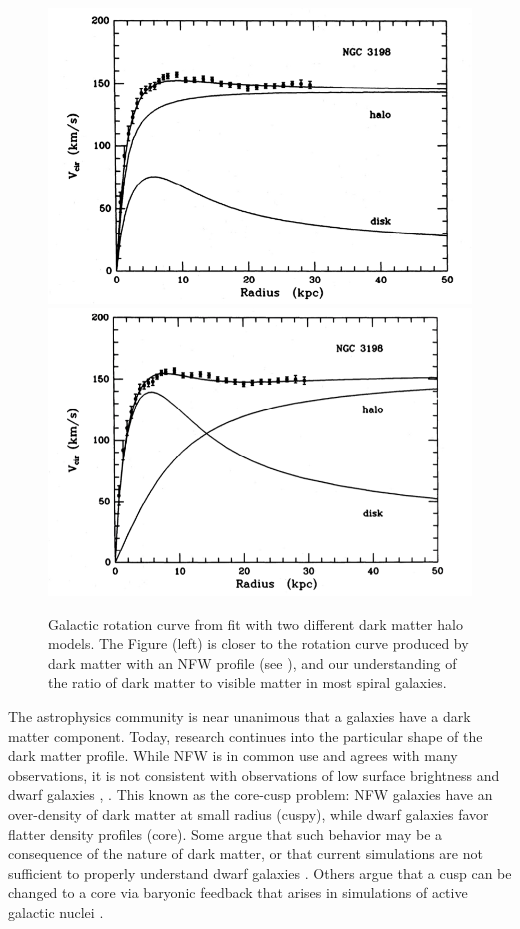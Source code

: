\begin{figure}[htbp]
\begin{center}
\includegraphics[width=\halffig]{figures/theory/rot_curve2.png}
\includegraphics[width=\halffig]{figures/theory/rot_curve1.png}
\caption{Galactic rotation curve from \cite{Albada1985} fit with two different dark matter halo models. The Figure (left) is closer to the rotation curve produced by dark matter with an \acs{NFW} profile (see \cite{Navarro1996}), and our understanding of the ratio of dark matter to visible matter in most spiral galaxies. }
\label{fig:rot_curve}
\end{center}
\end{figure}

The astrophysics community is near unanimous that a galaxies have a dark matter component. Today, research continues into the particular shape of the dark matter profile. While \ac{NFW} is in common use and agrees with many observations, it is not consistent with observations of low surface brightness and dwarf galaxies \cite{DeBlok2001}, \cite{DeBlok2001a}. This known as the core-cusp problem: \ac{NFW} galaxies have an over-density of dark matter at small radius (cuspy), while dwarf galaxies favor flatter density profiles (core). Some argue that such behavior may be a consequence of the nature of dark matter, or that current simulations are not sufficient to properly understand dwarf galaxies \cite{Oman2015}. Others argue that a cusp can be changed to a core via baryonic feedback that arises in simulations of active galactic nuclei \cite{Martizzi2013}. 

